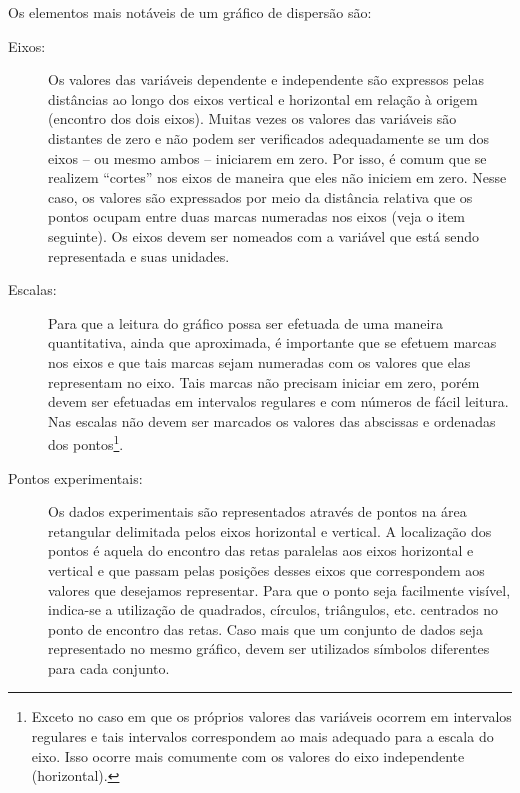 Os elementos mais notáveis de um gráfico de dispersão são:
\begin{description}
	\item[Eixos:] Os valores das variáveis dependente e independente  são expressos pelas distâncias ao longo dos eixos vertical e horizontal em relação à origem (encontro dos dois eixos). Muitas vezes os valores das variáveis são distantes de zero e não podem ser verificados adequadamente se um dos eixos -- ou mesmo ambos -- iniciarem em zero. Por isso, é comum que se realizem ``cortes'' nos eixos de maneira que eles não iniciem em zero. Nesse caso, os valores são expressados por meio da distância relativa que os pontos ocupam entre duas marcas numeradas nos eixos (veja o item seguinte). Os eixos devem ser nomeados com a variável que está sendo representada e suas unidades.
	\item[Escalas:] Para que a leitura do gráfico possa ser efetuada de uma maneira quantitativa, ainda que aproximada, é importante que se efetuem marcas nos eixos e que tais marcas sejam numeradas com os valores que elas representam no eixo. Tais marcas não precisam iniciar em zero, porém devem ser efetuadas em intervalos regulares e com números de fácil leitura. Nas escalas não devem ser marcados os valores das abscissas e ordenadas dos pontos\footnote{Exceto no caso em que os próprios valores das variáveis ocorrem em intervalos regulares e tais intervalos correspondem ao mais adequado para a escala do eixo. Isso ocorre mais comumente com os valores do eixo independente (horizontal).}.
	\item[Pontos experimentais:] Os dados experimentais são representados através de pontos na área retangular delimitada pelos eixos horizontal e vertical. A localização dos pontos é aquela do encontro das retas paralelas aos eixos horizontal e vertical e que passam pelas posições desses eixos que correspondem aos valores que desejamos representar. Para que o ponto seja facilmente visível, indica-se a utilização de quadrados, círculos, triângulos, etc. centrados no ponto de encontro das retas. Caso mais que um conjunto de dados seja representado no mesmo gráfico, devem ser utilizados símbolos diferentes para cada conjunto.
\end{description}

